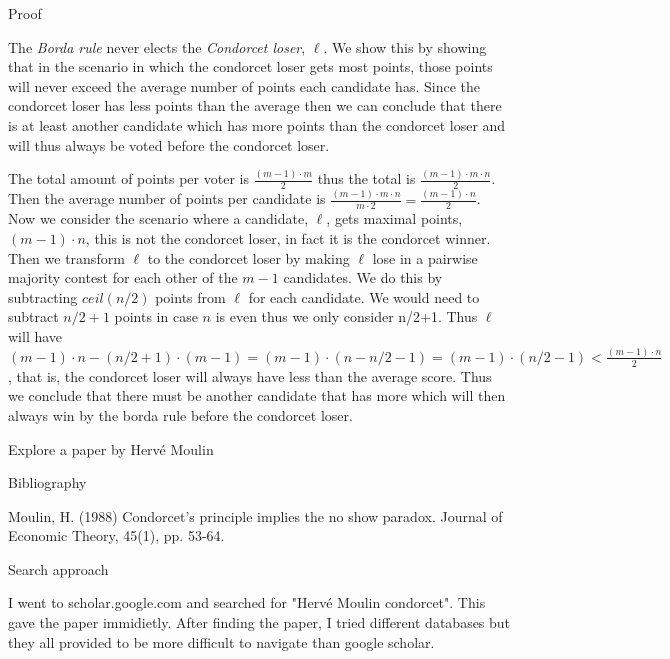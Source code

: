 \documentclass[12pt]{article}
\newenvironment{question}[2][Question]{\begin{trivlist}
\item[\hskip \labelsep {\bfseries #1}\hskip \labelsep {\bfseries #2.}]}{\end{trivlist}}
\newenvironment{answer}[2][Answer]{\begin{trivlist}
\item[\hskip \labelsep {\bfseries #1}\hskip \labelsep {\bfseries #2:}]}{\end{trivlist}}
\begin{document}
\begin{answer}{b)}{Proof}

The \textit{Borda rule} never elects the \textit{Condorcet loser}, $\ell$. We show this by showing that in the scenario in which the condorcet loser gets most points, those points will never exceed the average number of points each candidate has. Since the condorcet loser has less points than the average then we can conclude that there is at least another candidate which has more points than the condorcet loser and will thus always be voted before the condorcet loser.

The total amount of points per voter is $\frac{(m-1)\cdot m}{2}$ thus the total is $\frac{(m-1)\cdot m\cdot n}{2}$. Then the average number of points per candidate is $\frac{(m-1)\cdot m\cdot n}{m\cdot 2}=\frac{(m-1)\cdot n}{2}$. Now we consider the scenario where a candidate, $\ell$, gets maximal points, $(m-1) \cdot n$, this is not the condorcet loser, in fact it is the condorcet winner. Then we transform $\ell$ to the condorcet loser by making $\ell$ lose in a pairwise majority contest for each other of the $m-1$ candidates. We do this by subtracting $ceil(n/2)$ points from $\ell$ for each candidate. We would need to subtract $n/2+1$ points in case $n$ is even thus we only consider n/2+1. Thus $\ell$ will have $(m-1) \cdot n - (n/2+1)\cdot (m-1)=(m-1)\cdot (n-n/2-1)=(m-1)\cdot (n/2-1)<\frac{(m-1)\cdot n}{2}$, that is, the condorcet loser will always have less than the average score. Thus we conclude that there must be another candidate that has more which will then always win by the borda rule before the condorcet loser.
\end{answer}

\begin{question}{2}

Explore a paper by Hervé Moulin
\end{question}
\begin{answer}{a)}{Bibliography}

Moulin, H. (1988) Condorcet's principle implies the no show paradox. Journal of Economic Theory, 45(1), pp. 53-64.
\end{answer}

\begin{answer}{b)}{Search approach}

I went to scholar.google.com and searched for "Hervé Moulin condorcet". This gave the paper immidietly. After finding the paper, I tried different databases but they all provided to be more difficult to navigate than google scholar.
\end{answer}
\end{document}
